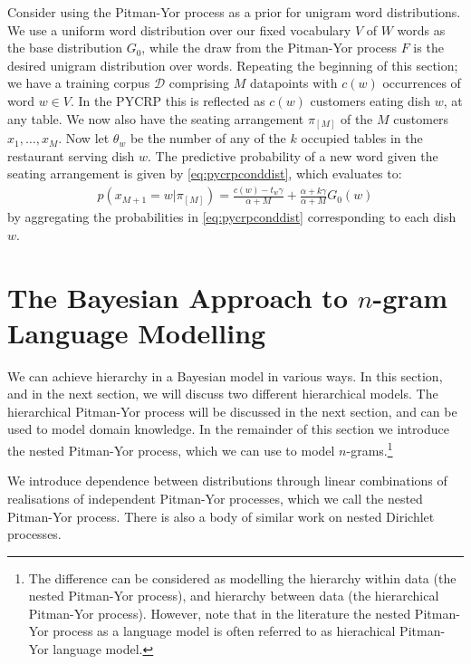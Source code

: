 Consider using the Pitman-Yor process as a prior for unigram word distributions. We use a uniform word distribution over our fixed vocabulary $V$ of $W$ words as the base distribution $G_0$, while the draw from the Pitman-Yor process $F$ is the desired unigram distribution over words. Repeating the beginning of this section; we have  a training corpus $\mathcal{D}$ comprising $M$ datapoints with $c(w)$ occurrences of word $w\in V$. In the PYCRP this is reflected as $c(w)$ customers eating dish $w$, at any table. We now also have the seating arrangement $\pi_{[M]}$ of the $M$ customers $x_1, \ldots, x_M$. Now let $\theta_w$ be the number of any of the $k$ occupied tables in the restaurant serving dish $w$. The predictive probability of a new word given the seating arrangement is given by \cref{eq:pycrpconddist}, which evaluates to:
\begin{align}
	p(x_{M+1} = w | \pi_{[M]}) = \frac{c(w)-t_w\gamma}{\alpha+M}+\frac{\alpha+k\gamma}{\alpha+M}G_0(w)
\end{align}
by aggregating the probabilities in \cref{eq:pycrpconddist} corresponding to each dish $w$. 


\section{The Bayesian Approach to $n$-gram Language Modelling}

We can achieve hierarchy in a Bayesian model in various ways. In this section, and in the next section, we will discuss two different hierarchical models. The hierarchical Pitman-Yor process will be discussed in the next section, and can be used to model domain knowledge. In the remainder of this section we introduce the nested Pitman-Yor process, which we can use to model $n$-grams.\footnote{The difference can be considered as modelling the hierarchy within data (the nested Pitman-Yor process), and hierarchy between data (the hierarchical Pitman-Yor process). However, note that in the literature the nested Pitman-Yor process as a language model is often referred to as hierachical Pitman-Yor language model.} 

We introduce dependence between distributions through linear combinations of realisations of independent Pitman-Yor processes, which we call the nested Pitman-Yor process.\cite{Teh2006AHierarchical,Teh2006ATechnical} There is also a body of similar work on nested Dirichlet processes.\cite{Blei2010The,Rodriguez2008The}

